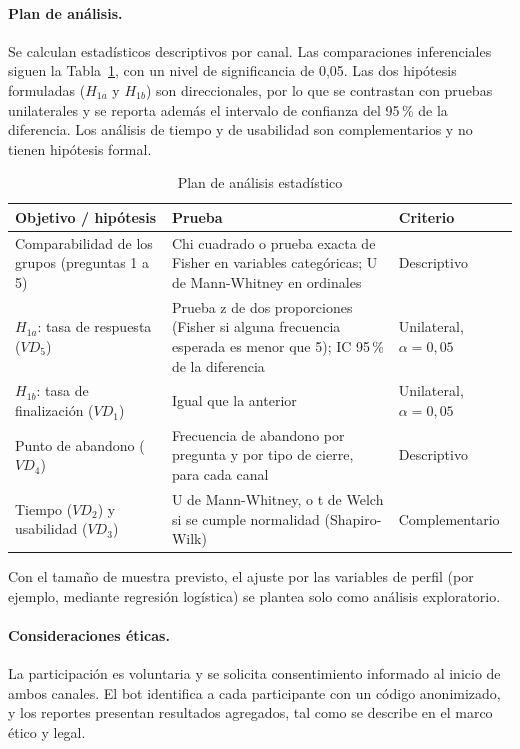 \documentclass[12pt,letterpaper]{article}
\begin{document}
\paragraph{Plan de análisis.} Se calculan estadísticos descriptivos por canal. Las comparaciones inferenciales siguen la Tabla~\ref{tab:analisis}, con un nivel de significancia de 0,05. Las dos hipótesis formuladas ($H_{1a}$ y $H_{1b}$) son direccionales, por lo que se contrastan con pruebas unilaterales y se reporta además el intervalo de confianza del 95\,\% de la diferencia. Los análisis de tiempo y de usabilidad son complementarios y no tienen hipótesis formal.

\begin{table}[htbp]
\centering
\caption{Plan de análisis estadístico}
\label{tab:analisis}
\small
\begin{tabular}{|p{3.6cm}|p{5.9cm}|p{3.2cm}|}
\hline
\textbf{Objetivo / hipótesis} & \textbf{Prueba} & \textbf{Criterio} \\ \hline
Comparabilidad de los grupos (preguntas 1 a 5) & Chi cuadrado o prueba exacta de Fisher en variables categóricas; U de Mann-Whitney en ordinales & Descriptivo \\ \hline
$H_{1a}$: tasa de respuesta ($VD_5$) & Prueba z de dos proporciones (Fisher si alguna frecuencia esperada es menor que 5); IC 95\,\% de la diferencia & Unilateral, $\alpha = 0{,}05$ \\ \hline
$H_{1b}$: tasa de finalización ($VD_1$) & Igual que la anterior & Unilateral, $\alpha = 0{,}05$ \\ \hline
Punto de abandono ($VD_4$) & Frecuencia de abandono por pregunta y por tipo de cierre, para cada canal & Descriptivo \\ \hline
Tiempo ($VD_2$) y usabilidad ($VD_3$) & U de Mann-Whitney, o t de Welch si se cumple normalidad (Shapiro-Wilk) & Complementario \\ \hline
\end{tabular}
\end{table}

Con el tamaño de muestra previsto, el ajuste por las variables de perfil (por ejemplo, mediante regresión logística) se plantea solo como análisis exploratorio.

\paragraph{Consideraciones éticas.} La participación es voluntaria y se solicita consentimiento informado al inicio de ambos canales. El bot identifica a cada participante con un código anonimizado, y los reportes presentan resultados agregados, tal como se describe en el marco ético y legal.
\end{document}
